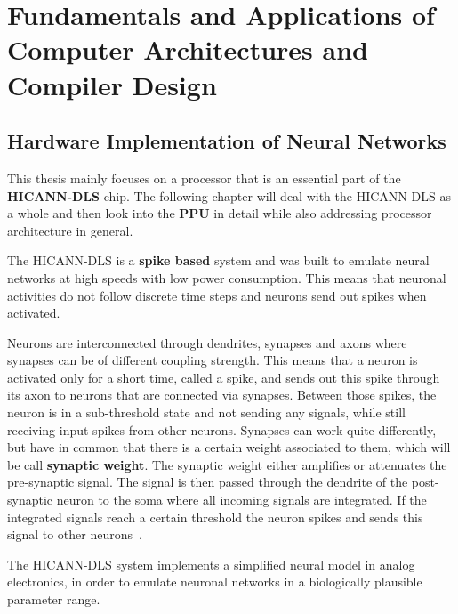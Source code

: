 \chapter{Fundamentals and Applications of Computer Architectures and Compiler Design}
\label{ch:methods}
\acresetall

\section{Hardware Implementation of Neural Networks}
This thesis mainly focuses on a processor that is an essential part of the \textbf{\ac{HICANN-DLS}} chip.
The following chapter will deal with the \ac{HICANN-DLS} as a whole and then look into the \textbf{\ac{PPU}} in detail while also addressing processor architecture in general.

The \ac{HICANN-DLS} is a \textbf{spike based} system and was built to emulate neural networks at high speeds with low power consumption.
This means that neuronal activities do not follow discrete time steps and neurons send out spikes when activated.

Neurons are interconnected through dendrites, synapses and axons where synapses can be of different coupling strength. 
This means that a neuron is activated only for a short time, called a spike, and sends out this spike through its axon to neurons that are connected via synapses.
Between those spikes, the neuron is in a sub-threshold state and not sending any signals, while still receiving input spikes from other neurons.
Synapses can work quite differently, but have in common that there is a certain weight associated to them, which will be call \textbf{synaptic weight}.
The synaptic weight either amplifies or attenuates the pre-synaptic signal.
The signal is then passed through the dendrite of the post-synaptic neuron to the soma where all incoming signals are integrated.
If the integrated signals reach a certain threshold the neuron spikes and sends this signal to other neurons~\citep{silbernagl2009color}.

The \ac{HICANN-DLS} system implements a simplified neural model in analog electronics, in order to emulate neuronal networks in a biologically plausible parameter range.

